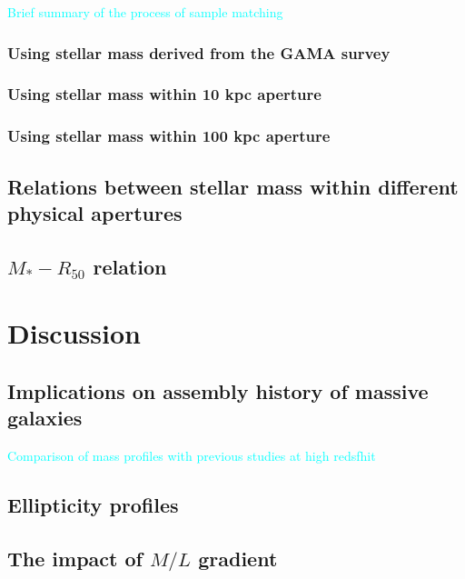 \documentclass[preprint]{aastex}
\newcommand{\plan}[1]{\textcolor{cyan}{#1}}
\begin{document}
\begin{CJK*}{UTF8}{gbsn}
    \plan{Brief summary of the process of sample matching}

\subsubsection{Using stellar mass derived from the GAMA survey}

\subsubsection{Using stellar mass within 10 kpc aperture}

\subsubsection{Using stellar mass within 100 kpc aperture}

\subsection{Relations between stellar mass within different physical apertures}

\subsection{$M_{\ast}-R_{\mathrm{50}}$ relation}


\section{Discussion}

\subsection{Implications on assembly history of massive galaxies}

    \plan{Comparison of mass profiles with previous studies at high redsfhit}

\subsection{Ellipticity profiles}

\subsection{The impact of $M/L$ gradient}


\end{CJK*}
\end{document}
